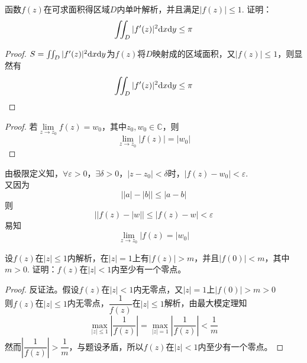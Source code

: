 \begin{proposition}
    
    函数$f(z)$在可求面积得区域$D$内单叶解析，并且满足$|f(z)| \leq 1$. 证明：
    $$\iint_{D}{|f'(z)|^2}\mathrm{d} x\mathrm{d} y \leq  \pi$$

\end{proposition}

\begin{proof}
    
    $S = \iint_{D}{|f'(z)|^2}\mathrm{d} x\mathrm{d} y$为$f(z)$将$D$映射成的区域面积，又$|f(z)| \leq 1$，则显然有
    $$\iint_{D}{|f'(z)|^2}\mathrm{d} x\mathrm{d} y \leq  \pi$$

\end{proof}

\begin{proof}
    
    若$\lim\limits_{z \to z_0}{f(z)} = w_0$，其中$z_0, w_0 \in \mathbb{C}$，则
    $$\lim\limits_{z \to z_0}{|f(z)|} = |w_0|$$

\end{proof}

\begin{proposition}
    
    由极限定义知，$\forall \varepsilon > 0$，$\exists \delta > 0$，$|z - z_0| < \delta$时，$|f(z) - w_0 | < \varepsilon$. \\
    又因为
    $$\Big||a| - |b|\Big| \leq |a - b|$$
    则 
    $$\Big| |f(z) - |w| \Big| \leq | f(z) - w| < \varepsilon $$
    易知
    $$\lim\limits_{z \to z_0}{|f(z)} = |w_0|$$

\end{proposition}

\begin{proposition}
    
    设$f(z)$在$|z| \leq 1$内解析，在$|z| = 1$上有$|f(z)| > m$，并且$|f(0)| < m$，其中$m > 0$. 证明：$f(z)$在$|z| < 1$内至少有一个零点。

\end{proposition}

\begin{proof}
    
    反证法。假设$f(z)$在$|z| < 1$内无零点，又$|z| = 1$上$|f(0)| > m > 0$ \\
    则$f(z)$在$|z| \leq 1$内无零点，$\dfrac{1}{f(z)}$在$|z| \leq 1$解析，由最大模定理知
    $$\max_{|z| \leq 1}{\left| \dfrac{1}{f(z)} \right|} = \max_{|z| = 1}{\left| \dfrac{1}{f(z)} \right|}  < \dfrac{1}{m}$$
    然而$\left| \dfrac{1}{f(z)} \right| > \dfrac{1}{m}$，与题设矛盾，所以$f(z)$在$|z| < 1$内至少有一个零点。

\end{proof}

